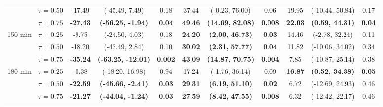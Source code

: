 \begin{table}[ht]
{\begin{tabular}{llccccccccc}
 & $\tau=0.50$ & -17.49 & (-45.49, 7.49) & 0.18 & 37.44 & (-0.23, 76.00) & 0.06 & 19.95 & (-10.44, 50.84) & 0.17 \\
 & $\tau=0.75$ & \textbf{-27.43} & \textbf{(-56.25, -1.94)} & \textbf{0.04} & \textbf{49.46} & \textbf{(14.69, 82.08)} & \textbf{0.008} & \textbf{22.03} & \textbf{(0.59, 44.31)} & \textbf{0.04} \\
\midrule
\multirow{3}{*}{150 min} & $\tau=0.25$ & -9.75 & (-24.50, 4.03) & 0.18 & \textbf{24.20} & \textbf{(2.00, 46.73)} & \textbf{0.03} & 14.46 & (-2.78, 32.24) & 0.11 \\
 & $\tau=0.50$ & -18.20 & (-43.49, 2.84) & 0.10 & \textbf{30.02} & \textbf{(2.31, 57.77)} & \textbf{0.04} & 11.82 & (-10.06, 34.02) & 0.34 \\
 & $\tau=0.75$ & \textbf{-35.24} & \textbf{(-63.25, -12.01)} & \textbf{0.002} & \textbf{43.09} & \textbf{(14.87, 70.75)} & \textbf{0.004} & 7.85 & (-10.87, 25.14) & 0.38 \\
\midrule
\multirow{3}{*}{180 min} & $\tau=0.25$ & -0.38 & (-18.20, 16.98) & 0.94 & 17.24 & (-1.76, 36.14) & 0.09 & \textbf{16.87} & \textbf{(0.52, 34.38)} & \textbf{0.05} \\
 & $\tau=0.50$ & \textbf{-22.59} & \textbf{(-45.66, -2.41)} & \textbf{0.03} & \textbf{29.31} & \textbf{(6.19, 51.10)} & \textbf{0.02} & 6.72 & (-12.69, 24.93) & 0.46 \\
 & $\tau=0.75$ & \textbf{-21.27} & \textbf{(-44.04, -1.24)} & \textbf{0.03} & \textbf{27.59} & \textbf{(8.42, 47.55)} & \textbf{0.008} & 6.32 & (-12.42, 22.17) & 0.46 \\
\bottomrule
\end{tabular}%
}
\end{table}
